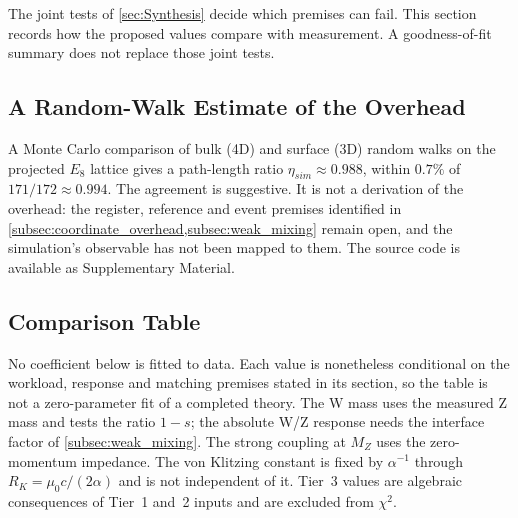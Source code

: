 



The joint tests of \cref{sec:Synthesis} decide which premises can fail. This section records how the proposed values compare with measurement. A goodness-of-fit summary does not replace those joint tests.

\subsection{A Random-Walk Estimate of the Overhead}
A Monte Carlo comparison of bulk (4D) and surface (3D) random walks on the projected $E_8$ lattice gives a path-length ratio $\eta_{sim}\approx0.988$, within $0.7\%$ of $171/172\approx0.994$. The agreement is suggestive. It is not a derivation of the overhead: the register, reference and event premises identified in \cref{subsec:coordinate_overhead,subsec:weak_mixing} remain open, and the simulation's observable has not been mapped to them. The source code is available as Supplementary Material.

\subsection{Comparison Table}
No coefficient below is fitted to data. Each value is nonetheless conditional on the workload, response and matching premises stated in its section, so the table is not a zero-parameter fit of a completed theory. The W mass uses the measured Z mass and tests the ratio $1-s$; the absolute W/Z response needs the interface factor of \cref{subsec:weak_mixing}. The strong coupling at $M_Z$ uses the zero-momentum impedance. The von Klitzing constant is fixed by $\alpha^{-1}$ through $R_K=\mu_0c/(2\alpha)$ and is not independent of it. Tier~3 values are algebraic consequences of Tier~1 and~2 inputs and are excluded from $\chi^2$.

